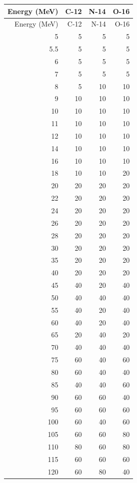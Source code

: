 \begin{longtable}{rrrr}
\toprule
Energy (MeV) & C-12 & N-14 & O-16 \\
\midrule
\endfirsthead
\toprule
Energy (MeV) & C-12 & N-14 & O-16 \\
\midrule
\endhead
5 & 5 & 5 & 5 \\
5.5 & 5 & 5 & 5 \\
6 & 5 & 5 & 5 \\
7 & 5 & 5 & 5 \\
8 & 5 & 10 & 10 \\
9 & 10 & 10 & 10 \\
10 & 10 & 10 & 10 \\
11 & 10 & 10 & 10 \\
12 & 10 & 10 & 10 \\
14 & 10 & 10 & 10 \\
16 & 10 & 10 & 10 \\
18 & 10 & 10 & 20 \\
20 & 20 & 20 & 20 \\
22 & 20 & 20 & 20 \\
24 & 20 & 20 & 20 \\
26 & 20 & 20 & 20 \\
28 & 20 & 20 & 20 \\
30 & 20 & 20 & 20 \\
35 & 20 & 20 & 20 \\
40 & 20 & 20 & 20 \\
45 & 40 & 20 & 40 \\
50 & 40 & 40 & 40 \\
55 & 40 & 20 & 40 \\
60 & 40 & 20 & 40 \\
65 & 20 & 40 & 20 \\
70 & 40 & 40 & 40 \\
75 & 60 & 40 & 60 \\
80 & 60 & 40 & 40 \\
85 & 40 & 40 & 60 \\
90 & 60 & 60 & 40 \\
95 & 60 & 60 & 60 \\
100 & 60 & 40 & 60 \\
105 & 60 & 60 & 80 \\
110 & 80 & 60 & 80 \\
115 & 60 & 60 & 60 \\
120 & 60 & 80 & 40 \\
\bottomrule
\end{longtable}
